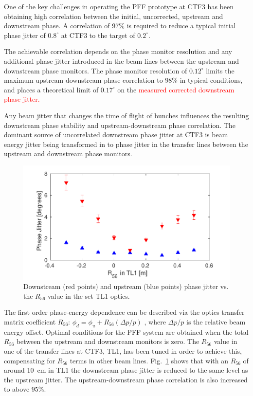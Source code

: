 \documentclass[%
 reprint,
superscriptaddress,
 amsmath,amssymb,
 prl,
]{revtex4-1}
\begin{document}
One of the key challenges in operating the PFF prototype at CTF3 has been 
obtaining high correlation between the initial, uncorrected, upstream and 
downstream phase. A correlation of 97\% is required to reduce a typical initial 
phase jitter of \(0.8^\circ\) at CTF3 to the target of \(0.2^\circ\). 

The achievable correlation depends on the phase monitor resolution and any 
additional phase jitter introduced in the beam lines between the upstream and 
downstream phase monitors. The phase monitor resolution of \(0.12^\circ\) 
limits the maximum upstream-downstream phase correlation to
\(98\%\) in typical conditions, and places a theoretical limit of
\(0.17^\circ\) on the \textcolor{red}{measured corrected downstream phase 
jitter.}

Any beam jitter that changes the time of flight of bunches influences the 
resulting downstream phase stability and upstream-downstream phase correlation. 
The dominant source of uncorrelated downstream phase jitter at CTF3 is beam 
energy jitter being transformed in to phase jitter in the transfer lines 
between the upstream and downstream phase monitors.

\begin{figure}
	\includegraphics[width=\columnwidth]{figs/r56Scan}%
	\caption{\label{fig:r56Scan}Downstream (red points) and upstream (blue 
		points) phase jitter vs. the \(R_{56}\) value in the set TL1 optics. 
		}
\end{figure}

The first order phase-energy dependence can be described via the optics 
transfer matrix coefficient \(R_{56}\):
\(\phi_d = \phi_u + R_{56}(\Delta p / p)\)
, where \(\Delta p / p\) is the relative beam energy offset.
Optimal conditions for the PFF system are obtained when the total \(R_{56}\) 
between the upstream and downstream monitors is zero.
The \(R_{56}\) value in one of the transfer lines at CTF3, TL1, has been tuned 
in order to achieve this, compensating for \(R_{56}\) terms in other beam lines.
Fig.~\ref{fig:r56Scan} shows that with an \(R_{56}\) of around 10~cm in TL1 the 
downstream phase jitter is reduced to the same level as the upstream jitter. 
The upstream-downstream phase correlation is also increased to above 95\%.
\end{document}

